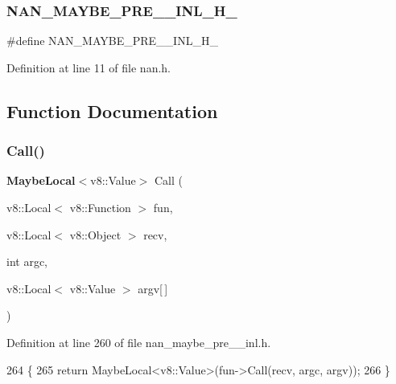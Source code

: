 \subsubsection{N\+A\+N\+\_\+\+M\+A\+Y\+B\+E\+\_\+\+P\+R\+E\+\_\+\_\+\+I\+N\+L\+\_\+\+H\+\_\+}
{\footnotesize\ttfamily \#define N\+A\+N\+\_\+\+M\+A\+Y\+B\+E\+\_\+\+P\+R\+E\+\_\+\_\+\+I\+N\+L\+\_\+\+H\+\_\+}



Definition at line 11 of file nan.\+h.



\subsection{Function Documentation}
\mbox{\label{nan__maybe__pre__43__inl_8h_a039813a5e5f26556ff53cf377e36e5d3}} 
\subsubsection{Call()}
{\footnotesize\ttfamily \textbf{ Maybe\+Local}$<$v8\+::\+Value$>$ Call (\begin{DoxyParamCaption}\item[{v8\+::\+Local$<$ v8\+::\+Function $>$}]{fun,  }\item[{v8\+::\+Local$<$ v8\+::\+Object $>$}]{recv,  }\item[{int}]{argc,  }\item[{v8\+::\+Local$<$ v8\+::\+Value $>$}]{argv[$\,$] }\end{DoxyParamCaption})}



Definition at line 260 of file nan\+\_\+maybe\+\_\+pre\+\_\+\_\+inl.\+h.


\begin{DoxyCode}
264                              \{
265   \textcolor{keywordflow}{return} MaybeLocal<v8::Value>(fun->Call(recv, argc, argv));
266 \}
\end{DoxyCode}
\mbox{\label{nan__maybe__pre__43__inl_8h_a163b88905f1bbcef12d8068bf9034516}} 
